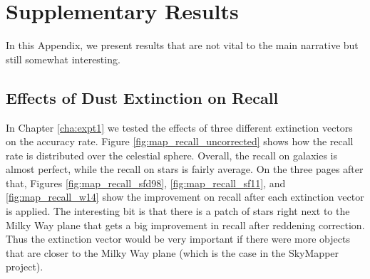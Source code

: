 \chapter{Supplementary Results}
\label{cha:supp}

In this Appendix, we present results that are not vital to the main narrative but still somewhat
interesting.

%
%
%


\section{Effects of Dust Extinction on Recall}

In Chapter \ref{cha:expt1} we tested the effects of three different extinction vectors 
on the accuracy rate. Figure \ref{fig:map_recall_uncorrected} shows how the recall rate is distributed
over the celestial sphere. Overall, the recall on galaxies is almost perfect, while
the recall on stars is fairly average. On the three pages after that, Figures \ref{fig:map_recall_sfd98}, \ref{fig:map_recall_sf11}, and \ref{fig:map_recall_w14} show
the improvement on recall after each extinction vector is applied. The interesting bit
is that there is a patch of stars right next to the Milky Way plane that gets a big improvement
in recall after reddening correction. Thus the extinction vector would be very important
if there were more objects that are closer to the Milky Way plane (which is the case in the SkyMapper project).


